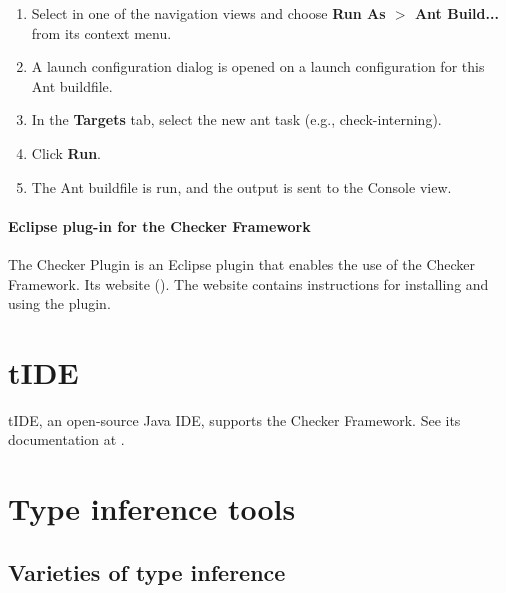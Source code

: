 \begin{enumerate}

\item
  Select  in one of the navigation views and choose
  {\bf Run As $>$ Ant Build...} from its context menu.

\item
  A launch configuration dialog is opened on a launch configuration
  for this Ant buildfile.

\item
  In the {\bf Targets} tab, select the new ant task (e.g., check-interning).

\item
  Click {\bf Run}.

\item
  The Ant buildfile is run, and the output is sent to the Console view.

\end{enumerate}

\paragraph{Eclipse plug-in for the Checker Framework}

The Checker Plugin is an Eclipse plugin that enables the use of the Checker
Framework.
Its website ().
The website contains instructions for installing and using the plugin.


\section{tIDE\label{tide}}

\begin{sloppypar}
tIDE, an open-source Java IDE, supports the Checker Framework.  See its
documentation at .
\end{sloppypar}


\section{Type inference tools\label{type-inference-tools}}

\subsection{Varieties of type inference}

